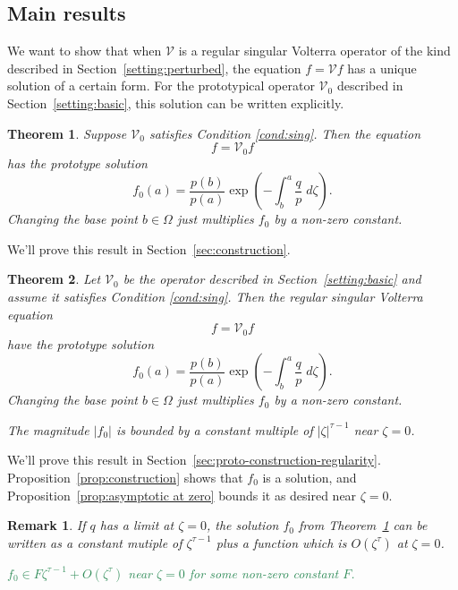 \documentclass{article}
\theoremstyle{plain}
\newtheorem{thm}{Theorem}
\newtheorem{rmk}{Remark}
\newcommand{\volterra}{\mathcal{V}}
\newcommand{\hardpart}{\mathcal{V}_0}
\newcommand{\solproto}{f_0}
\newcommand{\domain}{\Omega}
\begin{document}
\subsection{Main results}\label{sec:results}
We want to show that when $\volterra$ is a regular singular Volterra operator of the kind described in Section~\ref{setting:perturbed}, the equation $f = \volterra f$ has a unique solution of a certain form. For the prototypical operator $\hardpart$ described in Section~\ref{setting:basic}, this solution can be written explicitly.
\begin{thm}\label{thm:basic_volterra}
Suppose $\hardpart$ satisfies {\em Condition \eqref{cond:sing}}. Then the equation
\[ f = \hardpart f \]
has the {\em prototype solution}
\begin{equation}\label{eqn:test_solution}
\solproto(a)=\frac{p(b)}{p(a)} \exp\left(-\int_{b}^{a}\frac{q}{p}\;d\zeta\right).
\end{equation}
Changing the base point $b \in \domain$ just multiplies $f_0$ by a non-zero constant.
\end{thm}
We'll prove this result in Section~\ref{sec:construction}.
\color{Tomato}
\begin{thm}%
Let $\hardpart$ be the operator described in Section~\ref{setting:basic} and assume it satisfies {\em Condition \eqref{cond:sing}}. Then the regular singular Volterra equation
\[ f = \hardpart f \]
have the {\em prototype solution}
\begin{equation}%
f_0(a)=\frac{p(b)}{p(a)} \exp\left(-\int_{b}^{a}\frac{q}{p}\;d\zeta\right).
\end{equation}
Changing the base point $b \in \domain$ just multiplies $f_0$ by a non-zero constant.

The magnitude $|f_0|$ is bounded by a constant multiple of $|\zeta|^{\tau-1}$ near $\zeta = 0$.

\end{thm}
We'll prove this result in Section~\ref{sec:proto-construction-regularity}. Proposition~\ref{prop:construction} shows that $f_0$ is a solution, and Proposition~\ref{prop:asymptotic at zero} bounds it as desired near $\zeta = 0$.
\color{RoyalBlue}
\begin{rmk}
If $q$ has a limit at $\zeta = 0$, the solution $f_0$ from Theorem~\ref{thm:basic_volterra} can be written as a constant mutiple of $\zeta^{\tau-1}$ plus a function which is $O(\zeta^\tau)$ at $\zeta = 0$.

\textcolor{SeaGreen}{$f_0 \in F\zeta^{\tau-1} + O(\zeta^\tau)$ near $\zeta = 0$ for some non-zero constant $F$.}
\end{rmk}
\end{document}
